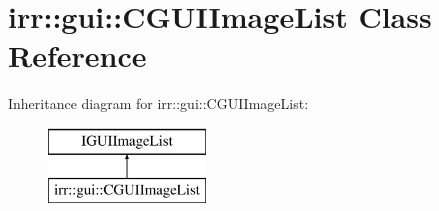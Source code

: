 \hypertarget{classirr_1_1gui_1_1_c_g_u_i_image_list}{\section{irr\-:\-:gui\-:\-:C\-G\-U\-I\-Image\-List Class Reference}
\label{classirr_1_1gui_1_1_c_g_u_i_image_list}
}
Inheritance diagram for irr\-:\-:gui\-:\-:C\-G\-U\-I\-Image\-List\-:\begin{figure}[H]
\begin{center}
\leavevmode
\includegraphics[height=2.000000cm]{classirr_1_1gui_1_1_c_g_u_i_image_list}
\end{center}
\end{figure}

